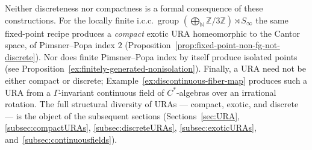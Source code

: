 \documentclass[12pt]{amsart} %
\theoremstyle{plain}
\theoremstyle{definition}
\newcommand{\N}{\mathbb{N}}
\newcommand{\Z}{\mathbb{Z}}
\begin{document}
Neither discreteness nor compactness is a formal consequence of these constructions.  For the locally finite i.c.c.\ group $\left(\bigoplus_{\N}\Z/3\Z\right)\rtimes S_\infty$ the same fixed-point recipe produces a \emph{compact} exotic URA homeomorphic to the Cantor space, of Pimsner--Popa index $2$ (Proposition~\ref{prop:fixed-point-non-fg-not-discrete}). Nor does finite Pimsner--Popa index by itself produce isolated points (see Proposition~\ref{ex:finitely-generated-nonisolation}). Finally, a URA need not be either compact or discrete; Example~\ref{ex:discontinuous-fiber-map} produces such a URA from a $\Gamma$-invariant continuous field of $C^*$-algebras over an irrational rotation. The full structural diversity of URAs --- compact, exotic, and discrete --- is the object of the subsequent sections (Sections~\ref{sec:URA}, \ref{subsec:compactURAs}, \ref{subsec:discreteURAs}, \ref{subsec:exoticURAs}, and~\ref{subsec:continuousfields}).
\end{document}
